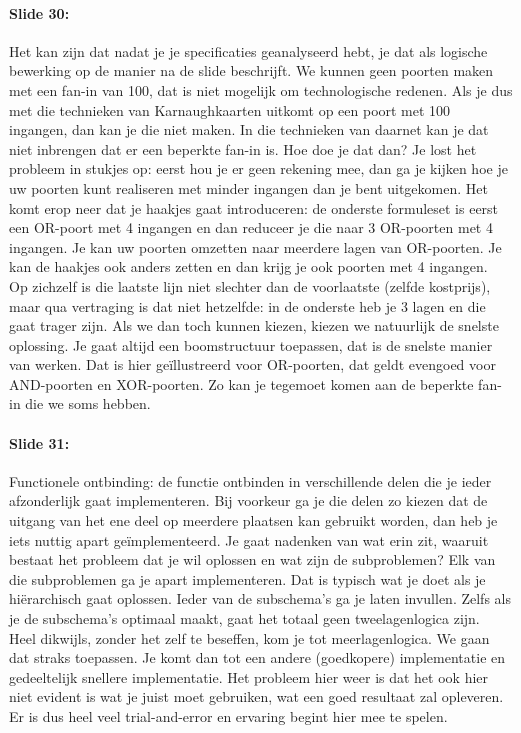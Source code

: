 \documentclass[10pt,a4paper]{book}
\begin{document}
\paragraph{Slide 30:} Het kan zijn dat nadat je je specificaties geanalyseerd hebt, je dat als logische bewerking op de manier na de slide beschrijft. We kunnen geen poorten maken met een fan-in van 100, dat is niet mogelijk om technologische redenen. Als je dus met die technieken van Karnaughkaarten uitkomt op een poort met 100 ingangen, dan kan je die niet maken. In die technieken van daarnet kan je dat niet inbrengen dat er een beperkte fan-in is. Hoe doe je dat dan? Je lost het probleem in stukjes op: eerst hou je er geen rekening mee, dan ga je kijken hoe je uw poorten kunt realiseren met minder ingangen dan je bent uitgekomen. Het komt erop neer dat je haakjes gaat introduceren: de onderste formuleset is eerst een OR-poort met 4 ingangen en dan reduceer je die naar 3 OR-poorten met 4 ingangen. Je kan uw poorten omzetten naar meerdere lagen van OR-poorten. Je kan de haakjes ook anders zetten en dan krijg je ook poorten met 4 ingangen.  \\
Op zichzelf is die laatste lijn niet slechter dan de voorlaatste (zelfde kostprijs), maar qua vertraging is dat niet hetzelfde: in de onderste heb je 3 lagen en die gaat trager zijn. Als we dan toch kunnen kiezen, kiezen we natuurlijk de snelste oplossing. Je gaat altijd een boomstructuur toepassen, dat is de snelste manier van werken. Dat is hier ge\"illustreerd voor OR-poorten, dat geldt evengoed voor AND-poorten en XOR-poorten.  Zo kan je tegemoet komen aan de beperkte fan-in die we soms hebben.

\paragraph{Slide 31:} Functionele ontbinding: de functie ontbinden in verschillende delen die je ieder afzonderlijk gaat implementeren. Bij voorkeur ga je die delen zo kiezen dat de uitgang van het ene deel op meerdere plaatsen kan gebruikt worden, dan heb je iets nuttig apart ge\"implementeerd. Je gaat nadenken van wat erin zit, waaruit bestaat het probleem dat je wil oplossen en wat zijn de subproblemen? Elk van die subproblemen ga je apart implementeren. Dat is typisch wat je doet als je hi\"erarchisch gaat oplossen. Ieder van de subschema's ga je laten invullen. Zelfs als je de subschema's optimaal maakt, gaat het totaal geen tweelagenlogica zijn.\\
Heel dikwijls, zonder het zelf te beseffen, kom je tot meerlagenlogica. We gaan dat straks toepassen. Je komt dan tot een andere (goedkopere) implementatie en gedeeltelijk snellere implementatie. Het probleem hier weer is dat het ook hier niet evident is wat je juist moet gebruiken, wat een goed resultaat zal opleveren. Er is dus heel veel trial-and-error en ervaring begint hier mee te spelen. 
\end{document}
